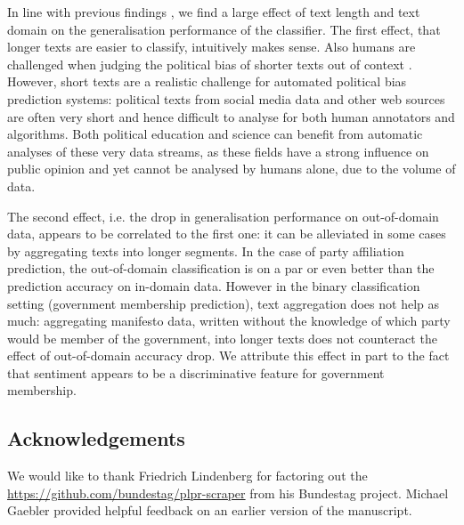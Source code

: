 \documentclass[11pt]{article}
\begin{document}
In line with previous findings \cite{Yu2008, Hirst2014}, we find a large effect of text length and text domain on the generalisation performance of the classifier. The first effect, that longer texts are easier to classify, intuitively makes sense. Also humans are challenged when judging the political bias of shorter texts out of context \cite{Benoit.Forthcoming}.
However, short texts are a realistic challenge for automated political bias prediction systems: political texts from social media data and other web sources are often very short and hence difficult to analyse for both human annotators and algorithms. Both political education and science can benefit from automatic analyses of these very data streams, as these fields have a strong influence on public opinion and yet cannot be analysed by humans alone, due to the volume of data. 

The second effect, i.e. the drop in generalisation performance on out-of-domain data, appears to be correlated to the first one: it can be alleviated in some cases by aggregating texts into longer segments. In the case of party affiliation prediction, the out-of-domain classification is on a par or even better than the prediction accuracy on in-domain data. However in the binary classification setting (government membership prediction), text aggregation does not help as much: aggregating manifesto data, written without the knowledge of which party would be member of the government, into longer texts does not counteract the effect of out-of-domain accuracy drop. We attribute this effect in part to the fact that sentiment appears to be a discriminative feature for government membership. 

\subsection*{Acknowledgements}
We would like to thank Friedrich Lindenberg for factoring out the \url{https://github.com/bundestag/plpr-scraper} from his Bundestag project. Michael Gaebler provided helpful feedback on an earlier version of the manuscript. \\
%


\end{document}
